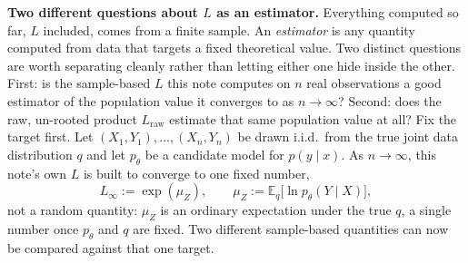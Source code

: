\documentclass[11pt]{article}
\begin{document}
\textbf{Two different questions about $L$ as an estimator.} Everything
computed so far, $L$ included, comes from a finite sample. An
\emph{estimator} is any quantity computed from data that targets a
fixed theoretical value. Two distinct questions are worth
separating cleanly rather than letting either one hide inside the
other. First: is the sample-based $L$ this note computes on $n$ real
observations a good estimator of the population value it converges to
as $n \to \infty$? Second: does the raw, un-rooted product
$L_{\text{raw}}$ estimate that same population value at all? Fix the
target first. Let $(X_1,Y_1),\dots,(X_n,Y_n)$ be drawn i.i.d.\ from the
true joint data distribution $q$ and let $p_\theta$ be a candidate
model for $p(y \mid x)$. As $n \to \infty$, this note's own $L$ is
built to converge to one fixed number,
$$L_\infty := \exp(\mu_Z), \qquad \mu_Z := \mathbb E_q\big[\ln
p_\theta(Y \mid X)\big],$$
not a random quantity: $\mu_Z$ is an ordinary expectation under the true
$q$, a single number once $p_\theta$ and $q$ are fixed. Two different
sample-based quantities can now be compared against that one target.
\end{document}
